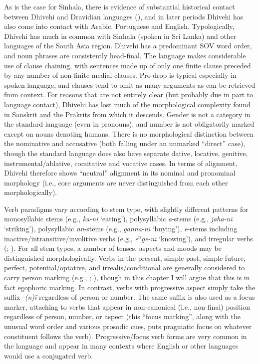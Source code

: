 \documentclass[output=paper]{langsci/langscibook}
\begin{document}
As is the case for Sinhala, there is evidence of substantial historical contact between Dhivehi and Dravidian languages (\citealt{Cain2000}), and in later periods Dhivehi has also come into contact with Arabic, Portuguese and English. Typologically, Dhivehi has much in common with Sinhala (spoken in Sri Lanka) and other languages of the South Asia region. Dhivehi has a predominant SOV word order, and noun phrases are consistently head-final. The language makes considerable use of clause chaining, with sentences made up of only one finite clause preceded by any number of non-finite medial clauses. Pro-drop is typical especially in spoken language, and clauses tend to omit as many arguments as can be retrieved from context. For reasons that are not entirely clear (but probably due in part to language contact), Dhivehi has lost much of the morphological complexity found in Sanskrit and the Prakrits from which it descends. Gender is not a category in the standard language (even in pronouns), and number is not obligatorily marked except on nouns denoting humans. There is no morphological distinction between the nominative and accusative (both falling under an unmarked “direct” case), though the standard language does also have separate dative, locative, genitive, instrumental/ablative, comitative and vocative cases. In terms of alignment, Dhivehi therefore shows “neutral” alignment in its nominal and pronominal morphology (i.e., core arguments are never distinguished from each other morphologically).

Verb paradigms vary according to stem type, with slightly different patterns for monosyllabic stems (e.g., \textit{ka-nī} ‘eating’), polysyllabic \textit{a}-stems (e.g., \textit{jaha-nī} ‘striking’), polysyllabic \textit{nn}-stems (e.g., \textit{ganna-nī} ‘buying’), \textit{e}-stems including inactive/intransitive/involitive verbs (e.g., \textit{e$^n$ge-nī} ‘knowing’), and irregular verbs (\citealt[22--25]{CainGair2000}; \citealt[136--146]{Gnanadesikan2017}). For all stem types, a number of tenses, aspects and moods may be distinguished morphologically. Verbs in the present, simple past, simple future, perfect, potential/optative, and irrealis/conditional are generally considered to carry person marking (e.g., \citealt[23--27]{CainGair2000}; \citealt[Chapter 8]{Gnanadesikan2017}), though in this chapter I will argue that this is in fact egophoric marking. In contrast, verbs with progressive aspect simply take the suffix ‑\textit{(n)ī} regardless of person or number. The same suffix is also used as a focus marker, attaching to verbs that appear in non-canonical (i.e., non-final) position regardless of person, number, or aspect (this “focus marking”, along with the unusual word order and various prosodic cues, puts pragmatic focus on whatever constituent follows the verb). Progressive/focus verb forms are very common in the language and appear in many contexts where English or other languages would use a conjugated verb. 
\end{document}
